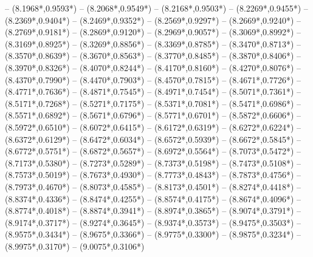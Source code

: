 {	-- ({8.1968*\dx},{0.9593*\dy})
	-- ({8.2068*\dx},{0.9549*\dy})
	-- ({8.2168*\dx},{0.9503*\dy})
	-- ({8.2269*\dx},{0.9455*\dy})
	-- ({8.2369*\dx},{0.9404*\dy})
	-- ({8.2469*\dx},{0.9352*\dy})
	-- ({8.2569*\dx},{0.9297*\dy})
	-- ({8.2669*\dx},{0.9240*\dy})
	-- ({8.2769*\dx},{0.9181*\dy})
	-- ({8.2869*\dx},{0.9120*\dy})
	-- ({8.2969*\dx},{0.9057*\dy})
	-- ({8.3069*\dx},{0.8992*\dy})
	-- ({8.3169*\dx},{0.8925*\dy})
	-- ({8.3269*\dx},{0.8856*\dy})
	-- ({8.3369*\dx},{0.8785*\dy})
	-- ({8.3470*\dx},{0.8713*\dy})
	-- ({8.3570*\dx},{0.8639*\dy})
	-- ({8.3670*\dx},{0.8563*\dy})
	-- ({8.3770*\dx},{0.8485*\dy})
	-- ({8.3870*\dx},{0.8406*\dy})
	-- ({8.3970*\dx},{0.8326*\dy})
	-- ({8.4070*\dx},{0.8244*\dy})
	-- ({8.4170*\dx},{0.8160*\dy})
	-- ({8.4270*\dx},{0.8076*\dy})
	-- ({8.4370*\dx},{0.7990*\dy})
	-- ({8.4470*\dx},{0.7903*\dy})
	-- ({8.4570*\dx},{0.7815*\dy})
	-- ({8.4671*\dx},{0.7726*\dy})
	-- ({8.4771*\dx},{0.7636*\dy})
	-- ({8.4871*\dx},{0.7545*\dy})
	-- ({8.4971*\dx},{0.7454*\dy})
	-- ({8.5071*\dx},{0.7361*\dy})
	-- ({8.5171*\dx},{0.7268*\dy})
	-- ({8.5271*\dx},{0.7175*\dy})
	-- ({8.5371*\dx},{0.7081*\dy})
	-- ({8.5471*\dx},{0.6986*\dy})
	-- ({8.5571*\dx},{0.6892*\dy})
	-- ({8.5671*\dx},{0.6796*\dy})
	-- ({8.5771*\dx},{0.6701*\dy})
	-- ({8.5872*\dx},{0.6606*\dy})
	-- ({8.5972*\dx},{0.6510*\dy})
	-- ({8.6072*\dx},{0.6415*\dy})
	-- ({8.6172*\dx},{0.6319*\dy})
	-- ({8.6272*\dx},{0.6224*\dy})
	-- ({8.6372*\dx},{0.6129*\dy})
	-- ({8.6472*\dx},{0.6034*\dy})
	-- ({8.6572*\dx},{0.5939*\dy})
	-- ({8.6672*\dx},{0.5845*\dy})
	-- ({8.6772*\dx},{0.5751*\dy})
	-- ({8.6872*\dx},{0.5657*\dy})
	-- ({8.6972*\dx},{0.5564*\dy})
	-- ({8.7073*\dx},{0.5472*\dy})
	-- ({8.7173*\dx},{0.5380*\dy})
	-- ({8.7273*\dx},{0.5289*\dy})
	-- ({8.7373*\dx},{0.5198*\dy})
	-- ({8.7473*\dx},{0.5108*\dy})
	-- ({8.7573*\dx},{0.5019*\dy})
	-- ({8.7673*\dx},{0.4930*\dy})
	-- ({8.7773*\dx},{0.4843*\dy})
	-- ({8.7873*\dx},{0.4756*\dy})
	-- ({8.7973*\dx},{0.4670*\dy})
	-- ({8.8073*\dx},{0.4585*\dy})
	-- ({8.8173*\dx},{0.4501*\dy})
	-- ({8.8274*\dx},{0.4418*\dy})
	-- ({8.8374*\dx},{0.4336*\dy})
	-- ({8.8474*\dx},{0.4255*\dy})
	-- ({8.8574*\dx},{0.4175*\dy})
	-- ({8.8674*\dx},{0.4096*\dy})
	-- ({8.8774*\dx},{0.4018*\dy})
	-- ({8.8874*\dx},{0.3941*\dy})
	-- ({8.8974*\dx},{0.3865*\dy})
	-- ({8.9074*\dx},{0.3791*\dy})
	-- ({8.9174*\dx},{0.3717*\dy})
	-- ({8.9274*\dx},{0.3645*\dy})
	-- ({8.9374*\dx},{0.3573*\dy})
	-- ({8.9475*\dx},{0.3503*\dy})
	-- ({8.9575*\dx},{0.3434*\dy})
	-- ({8.9675*\dx},{0.3366*\dy})
	-- ({8.9775*\dx},{0.3300*\dy})
	-- ({8.9875*\dx},{0.3234*\dy})
	-- ({8.9975*\dx},{0.3170*\dy})
	-- ({9.0075*\dx},{0.3106*\dy})
}
